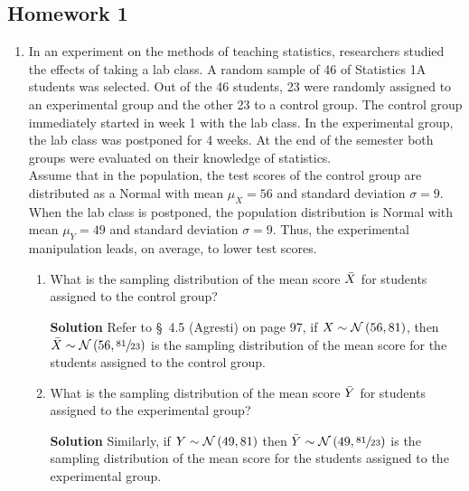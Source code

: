 
\subsection{Homework 1}
\begin{enumerate}
    \item In an experiment on the methods of teaching statistics, researchers studied the effects of taking a lab class. A random sample of 46 of Statistics 1A students was selected. Out of the 46 students, 23 were randomly assigned to an experimental group and the other 23 to a control group. The control group immediately started in week 1 with the lab class. In the experimental group, the lab class was postponed for 4 weeks. At the end of the semester both groups were evaluated on their knowledge of statistics. \\
    Assume that in the population, the test scores of the control group are distributed as a Normal with mean $\mu_X = 56$ and standard deviation $\sigma = 9$. When the lab class is postponed, the population distribution is Normal with mean $\mu_Y = 49$ and standard deviation $\sigma = 9$. Thus, the experimental manipulation leads, on average, to lower test scores.
    \begin{enumerate}
        \item What is the sampling distribution of the mean score $\Bar{X}$ for students assigned to the control group?
        \begin{framed}{\textbf{Solution}}
            Refer to \S~4.5 (Agresti) on page 97, if $X \sim \mathcal{N} \left( 56,81\right)$, then $\Bar{X} \sim \mathcal{N} \left( 56, \sfrac{81}{23}\right)$ is the sampling distribution of the mean score for the students assigned to the control group.
        \end{framed}
        
        \item What is the sampling distribution of the mean score $\Bar{Y}$ for students assigned to the experimental group?
        \begin{framed}{\textbf{Solution}}
            Similarly, if $Y \sim \mathcal{N} \left( 49,81\right)$ then $\Bar{Y} \sim \mathcal{N} \left( 49,\sfrac{81}{23}\right)$ is the sampling distribution of the mean score for the students assigned to the experimental group.
        \end{framed}
        

\end{enumerate}
\end{enumerate}
